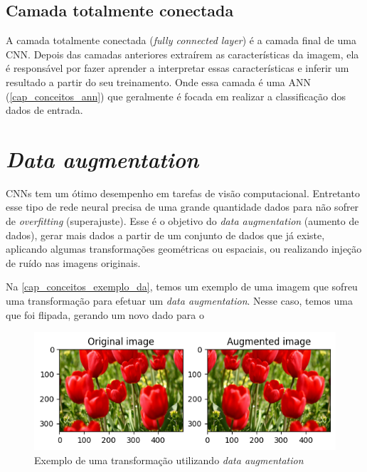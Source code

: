 \subsection{Camada totalmente conectada}\label{cap_conceitos_cnn_totalmente}
A camada totalmente conectada (\textit{fully connected layer}) é a camada final de uma CNN.
Depois das camadas anteriores extraírem as características da imagem, ela é responsável por
fazer aprender a interpretar essas características e inferir um resultado a partir do seu treinamento.
Onde essa camada é uma ANN (\autoref{cap_conceitos_ann}) que geralmente é focada em realizar a classificação dos dados
de entrada.

\section{\textit{Data augmentation}}\label{cap_conceitos_data_augmentation}
CNNs tem um ótimo desempenho em tarefas de visão computacional. Entretanto esse tipo de rede neural precisa de uma
grande quantidade dados para não sofrer de \textit{overfitting} (superajuste). \cite{shorten2019survey}
Esse é o objetivo do \textit{data augmentation} (aumento de dados), gerar mais dados a partir de um conjunto de dados
que já existe, aplicando algumas transformações geométricas ou espaciais, ou realizando injeção de ruído nas imagens
originais.

Na \autoref{cap_conceitos_exemplo_da}, temos um exemplo de uma imagem que sofreu uma transformação para efetuar um \textit{data augmentation}.
Nesse caso, temos uma que foi flipada, gerando um novo dado para o 

\begin{figure}[htb]
	\caption {\label{cap_conceitos_exemplo_da}Exemplo de uma transformação utilizando \textit{data augmentation}}
	\begin{center}
		\includegraphics[scale=1]{Imagens/exemplo_da}
	\end{center}
\end{figure}

